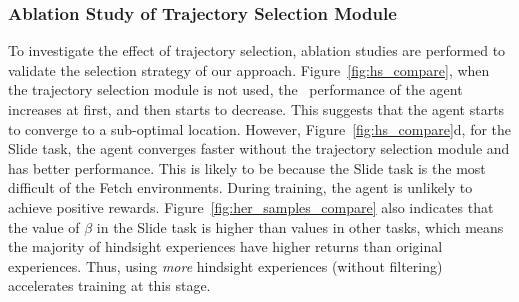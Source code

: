 \subsubsection{Ablation Study of Trajectory Selection Module}
To investigate the effect of trajectory selection, {ablation studies are performed} to validate the selection strategy of our approach. {Figure~\ref{fig:hs_compare}}, when the trajectory selection module is not used, the~ performance of the agent increases at first, and then starts to decrease. This suggests that the agent starts to converge to a sub-optimal location. However, {Figure~\ref{fig:hs_compare}d}, for the Slide task, the agent converges faster without the trajectory selection module and has better performance. {This is likely to be because the Slide task is the most difficult of the Fetch environments. During training, the agent is unlikely to achieve positive rewards. Figure~\ref{fig:her_samples_compare} also indicates that the value of $\beta$ in the Slide task is higher than values in other tasks, which means the majority of hindsight experiences have higher returns than original experiences. Thus, using {\em more} hindsight experiences (without filtering) accelerates training at this stage.} 

